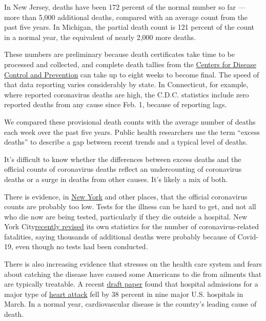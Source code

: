 In New Jersey, deaths have been 172 percent of the normal number so far
--- more than 5,000 additional deaths, compared with an average count
from the past five years. In Michigan, the partial death count is 121
percent of the count in a normal year, the equivalent of nearly 2,000
more deaths.

These numbers are preliminary because death certificates take time to be
processed and collected, and complete death tallies from the
\href{https://www.cdc.gov/nchs/nvss/vsrr/covid19/index.htm}{Centers for
Disease Control and Prevention} can take up to eight weeks to become
final. The speed of that data reporting varies considerably by state. In
Connecticut, for example, where reported coronavirus deaths are high,
the C.D.C. statistics include zero reported deaths from any cause since
Feb. 1, because of reporting lags.

We compared these provisional death counts with the average number of
deaths each week over the past five years. Public health researchers use
the term ``excess deaths'' to describe a gap between recent trends and a
typical level of deaths.

It's difficult to know whether the differences between excess deaths and
the official counts of coronavirus deaths reflect an undercounting of
coronavirus deaths or a surge in deaths from other causes. It's likely a
mix of both.

There is evidence, in
\href{https://www.nytimes3xbfgragh.onion/interactive/2020/04/10/upshot/coronavirus-deaths-new-york-city.html}{New
York} and other places, that the official coronavirus counts are
probably too low. Tests for the illness can be hard to get, and not all
who die now are being tested, particularly if they die outside a
hospital. New York
City\href{https://www.nytimes3xbfgragh.onion/2020/04/14/nyregion/new-york-coronavirus-deaths.html}{recently
revised} its own statistics for the number of coronavirus-related
fatalities, saying thousands of additional deaths were probably because
of Covid-19, even though no tests had been conducted.

There is also increasing evidence that stresses on the health care
system and fears about catching the disease have caused some Americans
to die from ailments that are typically treatable. A recent
\href{http://www.onlinejacc.org/content/accj/early/2020/04/07/j.jacc.2020.04.011.full.pdf}{draft
paper} found that hospital admissions for a major type of
\href{https://www.nytimes3xbfgragh.onion/2020/04/06/well/live/coronavirus-doctors-hospitals-emergency-care-heart-attack-stroke.html}{heart
attack} fell by 38 percent in nine major U.S. hospitals in March. In a
normal year, cardiovascular disease is the country's leading cause of
death.

